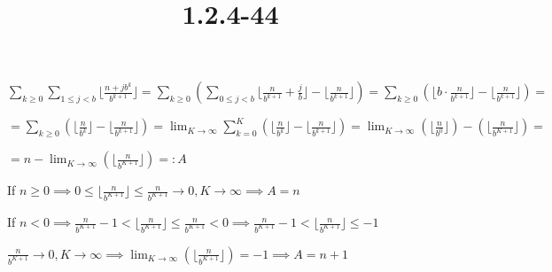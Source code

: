\documentclass{article}
\title{1.2.4-44}
\begin{document}
\maketitle

\( \sum_{k \geq 0}\sum_{1 \leq j < b} \lfloor{\frac{n + jb^k}{b^{k+1}}}\rfloor = \sum_{k \geq 0}(\sum_{0 \leq j < b} \lfloor{\frac{n}{b^{k+1}} + \frac{j}{b}}\rfloor - \lfloor{\frac{n}{b^{k+1}}}\rfloor) = \sum_{k \geq 0}(\lfloor{b \cdot \frac{n}{b^{k+1}}}\rfloor - \lfloor{\frac{n}{b^{k+1}}}\rfloor) = \)

\( = \sum_{k \geq 0}(\lfloor{\frac{n}{b^{k}}}\rfloor - \lfloor{\frac{n}{b^{k+1}}}\rfloor) = \lim_{K \to \infty} \sum_{k = 0}^K(\lfloor{\frac{n}{b^{k}}}\rfloor - \lfloor{\frac{n}{b^{k+1}}}\rfloor) = \lim_{K \to \infty}(\lfloor{\frac{n}{b^{0}}}\rfloor) - (\lfloor{\frac{n}{b^{K+1}}}\rfloor) = \)

\( = n - \lim_{K \to \infty} (\lfloor{\frac{n}{b^{K+1}}}\rfloor) =: A \)

If \( n \geq 0 \implies 0 \leq \lfloor{\frac{n}{b^{K+1}}}\rfloor \leq \frac{n}{b^{K + 1}} \to 0, K \to \infty \implies A = n \)

If \( n < 0 \implies \frac{n}{b^{K+1}} - 1 <\lfloor{\frac{n}{b^{K+1}}}\rfloor \leq \frac{n}{b^{K+1}} < 0 \implies \frac{n}{b^{K+1}} - 1 <\lfloor{\frac{n}{b^{K+1}}}\rfloor \leq -1 \)

\( \frac{n}{b^{K+1}} \to 0, K \to \infty \implies \lim_{K \to \infty} (\lfloor{\frac{n}{b^{K+1}}}\rfloor) = -1 \implies A = n + 1 \)
\end{document}
